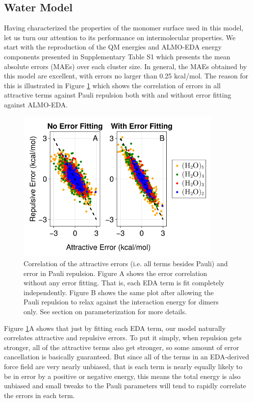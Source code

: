 \documentclass[journal=jctcce,manuscript=article]{achemso}
\begin{document}
\subsection*{Water Model}
Having characterized the properties of the monomer surface used in this model, let us turn our attention to its performance on intermolecular properties. We start with the reproduction of the QM energies and ALMO-EDA energy components presented in Supplementary Table S1 which presents the mean absolute errors (MAEs) over each cluster size. In general, the MAEs obtained by this model are excellent, with errors no larger than 0.25 kcal/mol. The reason for this is illustrated in Figure \ref{fig:error_correlation} which shows the correlation of errors in all attractive terms against Pauli repulsion both with and without error fitting against ALMO-EDA.
\begin{figure}[h]
  \includegraphics*[width=0.9\textwidth]{figures/error_correlation.png}
  \caption{Correlation of the attractive errors (i.e. all terms besides Pauli) and
  error in Pauli repulsion. Figure A shows the error correlation without any error
  fitting. That is, each EDA term is fit completely independently. Figure B shows
  the same plot after allowing the Pauli repulsion to relax against the interaction
  energy for dimers only. See section on parameterization for more details.
}
  \label{fig:error_correlation}
\end{figure}
Figure \ref{fig:error_correlation}A shows that just by fitting each EDA term, our model naturally correlates attractive and repulsive errors. To put it simply, when repulsion gets stronger, all of the attractive terms also get stronger, so some amount of error cancellation is basically guaranteed. But since all of the terms in an EDA-derived force field are very nearly unbiased, that is each term is nearly equally likely to be in error by a positive or negative energy, this means the total energy is also unbiased and small tweaks to the Pauli parameters will tend to rapidly correlate the errors in each term. %
\end{document}
